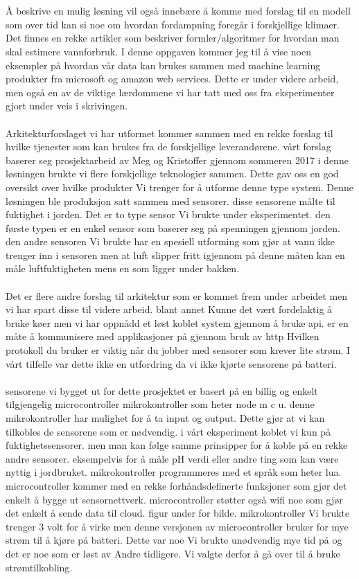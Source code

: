 \documentclass[]{uiophd}
\begin{document}
\\\\
Å beskrive en mulig løsning vil også innebære å komme med forslag til en modell som over tid kan si noe om hvordan fordampning foregår i forskjellige klimaer. Det finnes en rekke artikler som beskriver formler/algoritmer for hvordan man skal estimere vannforbruk. I denne oppgaven kommer jeg til å vise noen eksempler på hvordan vår data kan brukes sammen med machine learning produkter fra microsoft og amazon web services. Dette er under videre arbeid, men også en av de viktige lærdommene vi har tatt med oss fra eksperimenter gjort under veis i skrivingen.
\\\\
Arkitekturforslaget vi har utformet kommer sammen med en rekke forslag til hvilke tjenester som kan brukes fra de forskjellige leverandørene.  vårt forslag baserer seg prosjektarbeid av Meg og Kristoffer gjennom sommeren 2017 i denne løsningen brukte vi flere forskjellige teknologier sammen.  Dette gav oss en god oversikt over hvilke produkter Vi trenger for å utforme denne type system.  Denne løsningen ble produksjon satt sammen med sensorer. disse sensorene målte til fuktighet i jorden.  Det er to type sensor Vi brukte under eksperimentet.  den første typen er en enkel sensor som baserer seg på spenningen gjennom jorden.  den andre sensoren Vi brukte har en spesiell utforming som gjør at vann ikke trenger inn i sensoren men at luft slipper fritt igjennom på denne måten kan en måle luftfuktigheten mens en som ligger under bakken.
\\\\
Det er flere andre forslag til arkitektur som er kommet frem under arbeidet men vi har spart disse til   videre arbeid.  blant annet Kunne det vært fordelaktig å bruke køer men vi har oppnådd et løst koblet system gjennom å bruke api.   er en måte å kommunisere med applikasjoner på gjennom bruk av http Hvilken protokoll du bruker er viktig når du jobber med sensorer som krever lite strøm. I vårt tilfelle var dette ikke en utfordring da vi ikke kjørte sensorene på batteri.
\\\\
 sensorene vi bygget ut for dette prosjektet er basert på en billig og enkelt tilgjengelig microcontroller  mikrokontroller som heter node m c u.   denne mikrokontroller har mulighet for å ta input og output. Dette gjør at vi kan tilkobles de sensorene som er nødvendig. i vårt eksperiment koblet vi kun på fuktighetssensorer.  men man kan følge samme prinsipper for å koble på en rekke andre sensorer. eksempelvis for å måle pH verdi eller andre ting som kan være nyttig i jordbruket.  mikrokontroller programmeres med et språk som heter lua. microcontroller kommer med en rekke forhåndsdefinerte funksjoner som gjør det enkelt å bygge ut sensornettverk.  microcontroller støtter også wifi noe som gjør det enkelt å sende data til cloud. figur under for bilde. mikrokontroller  Vi brukte trenger 3 volt for å virke men denne versjonen av microcontroller bruker for mye strøm til å kjøre på batteri. Dette var noe Vi brukte unødvendig mye tid på og det er noe som er løst av Andre tidligere.  Vi valgte derfor å gå over til å bruke strømtilkobling. 
\end{document}
